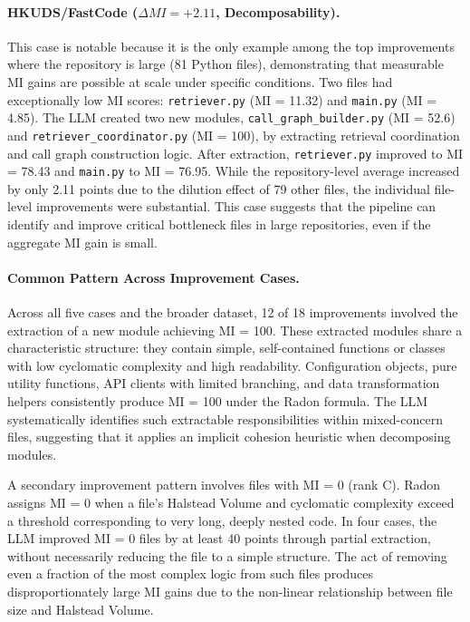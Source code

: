 \documentclass[sigconf,review,anonymous]{acmart}
\begin{document}
\paragraph{HKUDS/FastCode ($\Delta MI = +2.11$, Decomposability).}
This case is notable because it is the only example among the top improvements where the repository is large (81 Python files), demonstrating that measurable MI gains are possible at scale under specific conditions. Two files had exceptionally low MI scores: \texttt{retriever.py} (MI = 11.32) and \texttt{main.py} (MI = 4.85). The LLM created two new modules, \texttt{call\_graph\_builder.py} (MI = 52.6) and \texttt{retriever\_coordinator.py} (MI = 100), by extracting retrieval coordination and call graph construction logic. After extraction, \texttt{retriever.py} improved to MI = 78.43 and \texttt{main.py} to MI = 76.95. While the repository-level average increased by only 2.11 points due to the dilution effect of 79 other files, the individual file-level improvements were substantial. This case suggests that the pipeline can identify and improve critical bottleneck files in large repositories, even if the aggregate MI gain is small.

\paragraph{Common Pattern Across Improvement Cases.}
Across all five cases and the broader dataset, 12 of 18 improvements involved the extraction of a new module achieving MI = 100. These extracted modules share a characteristic structure: they contain simple, self-contained functions or classes with low cyclomatic complexity and high readability. Configuration objects, pure utility functions, API clients with limited branching, and data transformation helpers consistently produce MI = 100 under the Radon formula. The LLM systematically identifies such extractable responsibilities within mixed-concern files, suggesting that it applies an implicit cohesion heuristic when decomposing modules.

A secondary improvement pattern involves files with MI = 0 (rank C). Radon assigns MI = 0 when a file's Halstead Volume and cyclomatic complexity exceed a threshold corresponding to very long, deeply nested code. In four cases, the LLM improved MI = 0 files by at least 40 points through partial extraction, without necessarily reducing the file to a simple structure. The act of removing even a fraction of the most complex logic from such files produces disproportionately large MI gains due to the non-linear relationship between file size and Halstead Volume.
\end{document}
